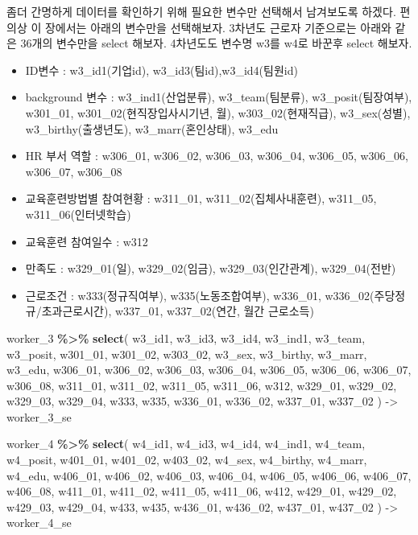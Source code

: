 \documentclass[
]{book}
\newenvironment{Shaded}{\begin{snugshade}}{\end{snugshade}}
\newcommand{\FunctionTok}[1]{\textcolor[rgb]{0.13,0.29,0.53}{\textbf{#1}}}
\newcommand{\NormalTok}[1]{#1}
\newcommand{\OtherTok}[1]{\textcolor[rgb]{0.56,0.35,0.01}{#1}}
\newcommand{\SpecialCharTok}[1]{\textcolor[rgb]{0.81,0.36,0.00}{\textbf{#1}}}
\providecommand{\tightlist}{%
  \setlength{\itemsep}{0pt}\setlength{\parskip}{0pt}}
\begin{document}
좀더 간명하게 데이터를 확인하기 위해 필요한 변수만 선택해서 남겨보도록 하겠다. 편의상 이 장에서는 아래의 변수만을 선택해보자. 3차년도 근로자 기준으로는 아래와 같은 36개의 변수만을 select 해보자. 4차년도도 변수명 w3를 w4로 바꾼후 select 해보자.

\begin{itemize}
\tightlist
\item
  ID변수 : w3\_id1(기업id), w3\_id3(팀id),w3\_id4(팀원id)
\item
  background 변수 : w3\_ind1(산업분류), w3\_team(팀분류), w3\_posit(팀장여부), w301\_01, w301\_02(현직장입사시기년, 월), w303\_02(현재직급), w3\_sex(성별), w3\_birthy(출생년도), w3\_marr(혼인상태), w3\_edu
\item
  HR 부서 역할 : w306\_01, w306\_02, w306\_03, w306\_04, w306\_05, w306\_06, w306\_07, w306\_08
\item
  교육훈련방법별 참여현황 : w311\_01, w311\_02(집체사내훈련), w311\_05, w311\_06(인터넷학습)
\item
  교육훈련 참여일수 : w312
\item
  만족도 : w329\_01(일), w329\_02(임금), w329\_03(인간관계), w329\_04(전반)
\item
  근로조건 : w333(정규직여부), w335(노동조합여부), w336\_01, w336\_02(주당정규/초과근로시간), w337\_01, w337\_02(연간, 월간 근로소득)
\end{itemize}

\begin{Shaded}
\begin{Highlighting}[]
\NormalTok{worker\_3 }\SpecialCharTok{\%\textgreater{}\%} 
  \FunctionTok{select}\NormalTok{(}
\NormalTok{    w3\_id1, w3\_id3, w3\_id4,}
\NormalTok{    w3\_ind1, w3\_team, w3\_posit,}
\NormalTok{    w301\_01, w301\_02, w303\_02,}
\NormalTok{    w3\_sex, w3\_birthy, w3\_marr, w3\_edu,}
\NormalTok{    w306\_01, w306\_02, w306\_03, w306\_04,}
\NormalTok{    w306\_05, w306\_06, w306\_07, w306\_08,}
\NormalTok{    w311\_01, w311\_02, w311\_05, w311\_06,}
\NormalTok{    w312,}
\NormalTok{    w329\_01, w329\_02, w329\_03, w329\_04,}
\NormalTok{    w333, w335,}
\NormalTok{    w336\_01, w336\_02,}
\NormalTok{    w337\_01, w337\_02}
\NormalTok{  ) }\OtherTok{{-}\textgreater{}}\NormalTok{ worker\_3\_se}

\NormalTok{worker\_4 }\SpecialCharTok{\%\textgreater{}\%} 
  \FunctionTok{select}\NormalTok{(}
\NormalTok{    w4\_id1, w4\_id3, w4\_id4,}
\NormalTok{    w4\_ind1, w4\_team, w4\_posit,}
\NormalTok{    w401\_01, w401\_02, w403\_02,}
\NormalTok{    w4\_sex, w4\_birthy, w4\_marr, w4\_edu,}
\NormalTok{    w406\_01, w406\_02, w406\_03, w406\_04,}
\NormalTok{    w406\_05, w406\_06, w406\_07, w406\_08,}
\NormalTok{    w411\_01, w411\_02, w411\_05, w411\_06,}
\NormalTok{    w412,}
\NormalTok{    w429\_01, w429\_02, w429\_03, w429\_04,}
\NormalTok{    w433, w435,}
\NormalTok{    w436\_01, w436\_02,}
\NormalTok{    w437\_01, w437\_02}
\NormalTok{  ) }\OtherTok{{-}\textgreater{}}\NormalTok{ worker\_4\_se}
\end{Highlighting}
\end{Shaded}
\end{document}
